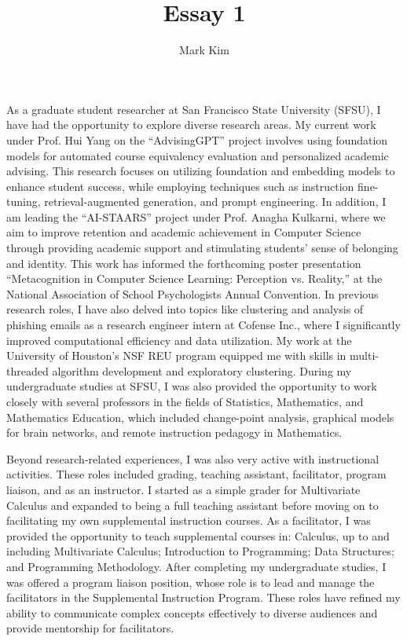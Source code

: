 \documentclass[12pt]{article}
\author{Mark Kim}
\title{Essay 1}
\begin{document}
\maketitle


As a graduate student researcher at San Francisco State University (SFSU), I have had the opportunity to explore diverse research areas. My
current work under Prof. Hui Yang on the ``AdvisingGPT'' project involves using foundation models for automated course equivalency evaluation and
personalized academic advising. This research focuses on utilizing foundation and embedding models to enhance student success, while
employing techniques such as instruction fine-tuning, retrieval-augmented generation, and prompt engineering. In addition, I am leading
the ``AI-STAARS'' project under Prof. Anagha Kulkarni, where we aim to improve retention and academic achievement in Computer Science through
providing academic support and stimulating students' sense of belonging and identity.  This work has informed the forthcoming
poster presentation ``Metacognition in Computer Science Learning: Perception vs. Reality,'' at the National Association of School
Psychologists Annual Convention.  In previous research roles, I have also delved into topics like clustering and analysis of phishing emails
as a research engineer intern at Cofense Inc., where I significantly improved computational efficiency and data utilization. My work at the
University of Houston's NSF REU program equipped me with skills in multi-threaded algorithm development and exploratory clustering.  During
my undergraduate studies at SFSU, I was also provided the opportunity to work closely with several professors in the fields of
Statistics, Mathematics, and Mathematics Education, which included change-point analysis, graphical models for brain networks, and remote
instruction pedagogy in Mathematics.

Beyond research-related experiences, I was also very active with instructional activities.  These roles included grading, teaching
assistant, facilitator, program liaison, and as an instructor.  I started as a simple grader for Multivariate Calculus and expanded to being
a full teaching assistant before moving on to facilitating my own supplemental instruction courses.  As a facilitator, I was provided the
opportunity to teach supplemental courses in: Calculus, up to and including Multivariate Calculus; Introduction to Programming; Data
Structures; and Programming Methodology.  After completing my undergraduate studies, I was offered a program liaison position, whose role
is to lead and manage the facilitators in the Supplemental Instruction Program.  These roles have refined my ability to communicate complex
concepts effectively to diverse audiences and provide mentorship for facilitators.
\end{document}
